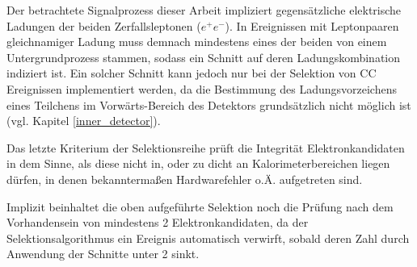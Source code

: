 \begin{description}
        Der betrachtete Signalprozess dieser Arbeit impliziert gegensätzliche
        elektrische Ladungen der beiden Zerfallsleptonen ($e^+e^-$). In
        Ereignissen mit Leptonpaaren gleichnamiger Ladung muss demnach
        mindestens eines der beiden von einem Untergrundprozess stammen, sodass
        ein Schnitt auf deren Ladungskombination indiziert ist. Ein solcher
        Schnitt kann jedoch nur bei der Selektion von \ac{CC} Ereignissen
        implementiert werden, da die Bestimmung des Ladungsvorzeichens eines
        Teilchens im Vorwärts-Bereich des Detektors grundsätzlich  nicht
        möglich ist (vgl. Kapitel \ref{inner_detector}).

        Das letzte Kriterium der Selektionsreihe prüft die Integrität
        Elektronkandidaten in dem Sinne, als diese nicht in, oder zu dicht an
        Kalorimeterbereichen liegen dürfen, in denen bekanntermaßen
        Hardwarefehler o.Ä. aufgetreten sind.
\end{description}
Implizit beinhaltet die oben aufgeführte Selektion noch die Prüfung nach dem
Vorhandensein von mindestens 2 Elektronkandidaten, da der Selektionsalgorithmus
ein Ereignis automatisch verwirft, sobald deren Zahl durch Anwendung der
Schnitte unter 2 sinkt.

